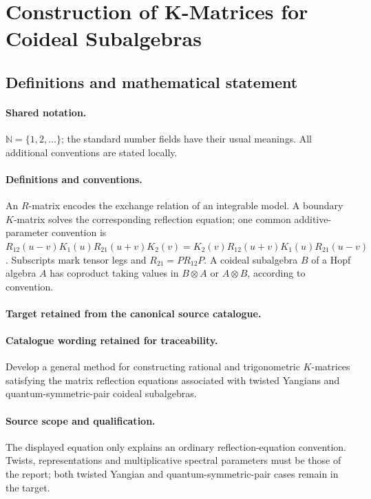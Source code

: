 \documentclass[11pt]{article}
\begin{document}
\section{Construction of K-Matrices for Coideal Subalgebras}\label{statement}

\subsection{Definitions and mathematical statement}

\paragraph{Shared notation.}$\mathbb N=\{1,2,\ldots\}$; the standard number fields have their usual meanings. All additional conventions are stated locally.


\paragraph{Definitions and conventions.}
An $R$-matrix encodes the exchange relation of an integrable model. A boundary $K$-matrix solves the corresponding reflection equation; one common additive-parameter convention is $R_{12}(u-v)K_1(u)R_{21}(u+v)K_2(v)=K_2(v)R_{12}(u+v)K_1(u)R_{21}(u-v)$. Subscripts mark tensor legs and $R_{21}=PR_{12}P$. A coideal subalgebra $B$ of a Hopf algebra $A$ has coproduct taking values in $B\otimes A$ or $A\otimes B$, according to convention.

\paragraph{Target retained from the canonical source catalogue.}
\paragraph{Catalogue wording retained for traceability.}
Develop a general method for constructing rational and trigonometric $K$-matrices satisfying the matrix reflection equations associated with twisted Yangians and quantum-symmetric-pair coideal subalgebras.

\paragraph{Source scope and qualification.}
The displayed equation only explains an ordinary reflection-equation convention. Twists, representations and multiplicative spectral parameters must be those of the report; both twisted Yangian and quantum-symmetric-pair cases remain in the target.
\end{document}

